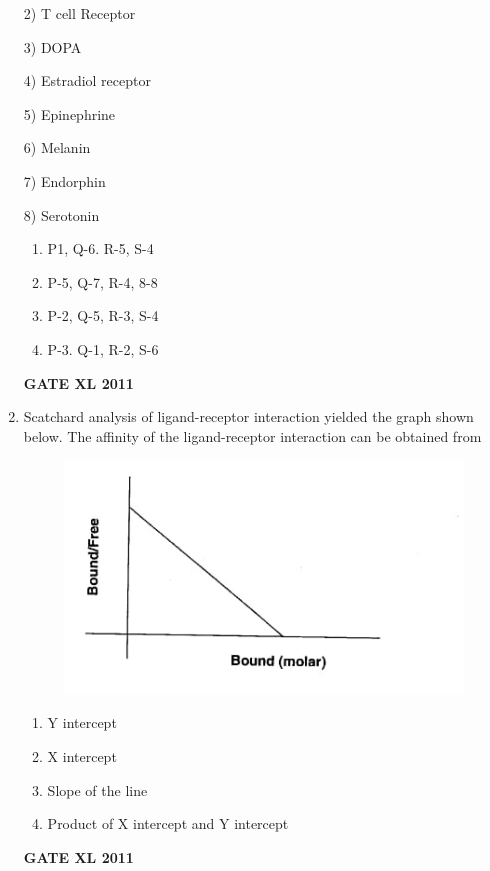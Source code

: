 \documentclass[journal,12pt,onecolumn]{IEEEtran}
\begin{document}
\begin{enumerate}
\begin{minipage}{0.5\textwidth}
\begin{flushleft}
2) T cell Receptor


3) DOPA


4) Estradiol receptor

5) Epinephrine

6) Melanin

7) Endorphin

8) Serotonin
		\end{flushleft}
		\end{minipage}

		\begin{enumerate}
			\item P1, Q-6. R-5, S-4
			\item P-5, Q-7, R-4, 8-8
			\item P-2, Q-5, R-3, S-4
			\item P-3. Q-1, R-2, S-6
		\end{enumerate}
		\hfill{\textbf{GATE XL 2011}}

	\item {Scatchard analysis of ligand-receptor interaction yielded the graph shown below. The affinity of the ligand-receptor interaction can be obtained from}

	\begin{figure}[h!]
	\centering
	\includegraphics[width=\textwidth]{20}
	\caption*{}
	\label{fig:Q20}
	\end{figure}

		\begin{enumerate}
			\item Y intercept
			\item X intercept
			\item Slope of the line
			\item Product of X intercept and Y intercept
		\end{enumerate}
		\hfill{\textbf{GATE XL 2011}}

\end{enumerate}
\end{document}
